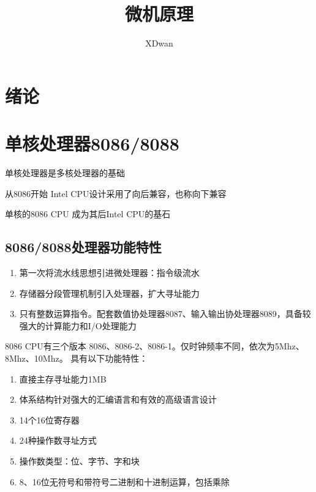 \documentclass{article}
\title{微机原理}
\author{XDwan}
\begin{document}
    
\renewcommand{\contentsname}{目录}%
\tableofcontents
\newpage

\section{绪论}

\section{单核处理器8086/8088}

单核处理器是多核处理器的基础

从8086开始 Intel CPU设计采用了向后兼容，也称向下兼容

单核的8086 CPU 成为其后Intel CPU的基石

\subsection{8086/8088处理器功能特性}

\begin{enumerate}
    \item 第一次将流水线思想引进微处理器：指令级流水
    \item 存储器分段管理机制引入处理器，扩大寻址能力
    \item 只有整数运算指令。配套数值协处理器8087、输入输出协处理器8089，具备较强大的计算能力和I/O处理能力
\end{enumerate}

8086 CPU有三个版本 8086、8086-2、8086-1。仅时钟频率不同，依次为5Mhz、8Mhz、10Mhz。
具有以下功能特性：

\begin{enumerate}
    \item 直接主存寻址能力1MB
    \item 体系结构针对强大的汇编语言和有效的高级语言设计
    \item 14个16位寄存器
    \item 24种操作数寻址方式
    \item 操作数类型：位、字节、字和块
    \item 8、16位无符号和带符号二进制和十进制运算，包括乘除
\end{enumerate}
\end{document}
